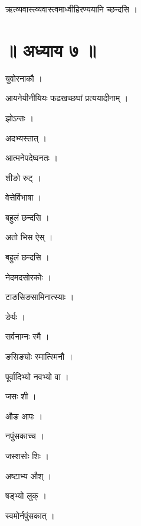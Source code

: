 \documentclass[10pt, openany]{book}
\begin{document}
\noindent ऋत्व्यवास्त्व्यवास्त्वमाध्वीहिरण्ययानि च्छन्दसि ।

\section*{॥ अध्याय ७ ॥}

\noindent युवोरनाकौ ।

\noindent आयनेयीनीयियः फढखच्छघां प्रत्ययादीनाम् ।

\noindent झोऽन्तः ।

\noindent अदभ्यस्तात् ।

\noindent आत्मनेपदेष्वनतः ।

\noindent शीङो रुट् ।

\noindent वेत्तेर्विभाषा ।

\noindent बहुलं छन्दसि ।

\noindent अतो भिस ऐस् ।

\noindent बहुलं छन्दसि ।

\noindent नेदमदसोरकोः ।

\noindent टाङसिङसामिनात्स्याः ।

\noindent ङेर्यः ।

\noindent सर्वनाम्नः स्मै ।

\noindent ङसिङ्योः स्मात्स्मिनौ ।

\noindent पूर्वादिभ्यो नवभ्यो वा ।

\noindent जसः शी ।

\noindent औङ आपः ।

\noindent नपुंसकाच्च ।

\noindent जस्शसोः शिः ।

\noindent अष्टाभ्य औश् ।

\noindent षड्भ्यो लुक् ।

\noindent स्वमोर्नपुंसकात् ।
\end{document}
